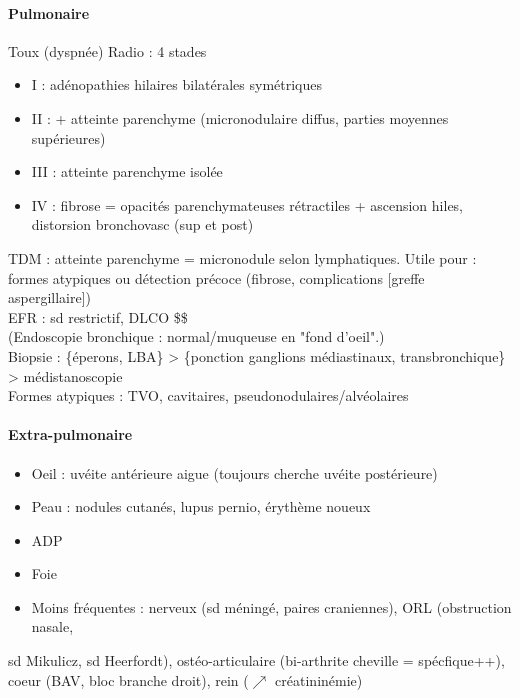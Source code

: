 \documentclass[11pt]{article}
\begin{document}
\paragraph{Pulmonaire}
\label{sec:orgf577e00}
\label{sec:org4ec1d7e}
Toux (dyspnée)
Radio : 4 stades

\begin{itemize}
\item I : adénopathies hilaires bilatérales symétriques
\item II : + atteinte parenchyme (micronodulaire diffus, parties moyennes supérieures)
\item III : atteinte parenchyme isolée
\item IV : fibrose = opacités parenchymateuses rétractiles + ascension hiles, distorsion bronchovasc (sup et post)
\end{itemize}

TDM : atteinte parenchyme = micronodule selon lymphatiques. Utile pour : formes atypiques ou détection précoce (fibrose, complications [greffe aspergillaire])\\
EFR : sd restrictif, DLCO \$\searrow\$\\
(Endoscopie bronchique : normal/muqueuse en "fond d'oeil".)\\
Biopsie : \{éperons, LBA\} > \{ponction ganglions médiastinaux, transbronchique\} > médistanoscopie\\
Formes atypiques : TVO, cavitaires, pseudonodulaires/alvéolaires

\paragraph{Extra-pulmonaire}
\label{sec:org842c2a5}
\label{sec:org316c190}

\begin{itemize}
\item Oeil : uvéite antérieure aigue (toujours cherche uvéite postérieure)
\item Peau : nodules cutanés, lupus pernio, érythème noueux
\item ADP
\item Foie
\item Moins fréquentes : nerveux (sd méningé, paires craniennes), ORL (obstruction
nasale,
\end{itemize}

sd Mikulicz, sd Heerfordt), ostéo-articulaire (bi-arthrite cheville =
spécfique++), 
coeur (BAV, bloc branche droit), rein (\(\nearrow\) créatininémie)
\end{document}

